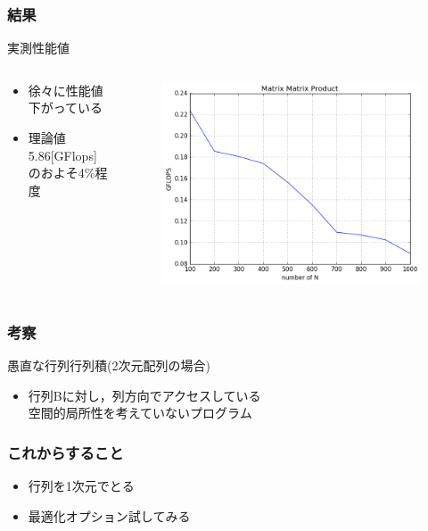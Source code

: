 \documentclass[dvipdfmx]{beamer}
\begin{document}
\begin{frame}
	\frametitle{結果}
	実測性能値
	\begin{columns}
	\begin{column}{0.48\textwidth}
	\begin{itemize}
		\item 徐々に性能値下がっている
		\item 理論値5.86[GFlops]のおよそ4\%程度
	\end{itemize}
	\end{column}
	\begin{column}{0.48\textwidth}
	\begin{figure}
		\includegraphics[width=0.48\paperwidth]{./sem_MatMatProduct.png}
  \end{figure}
	\end{column}
	\end{columns}
\end{frame}



\begin{frame}
	\frametitle{考察}
	愚直な行列行列積(2次元配列の場合)
	\begin{itemize}
		\item 行列Bに対し，列方向でアクセスしている\\ 空間的局所性を考えていないプログラム
	\end{itemize}
\end{frame}

\begin{frame}
	\frametitle{これからすること}
	\begin{itemize}
	\item 行列を1次元でとる
	\item 最適化オプション試してみる
	\end{itemize}
\end{frame}
\end{document}
